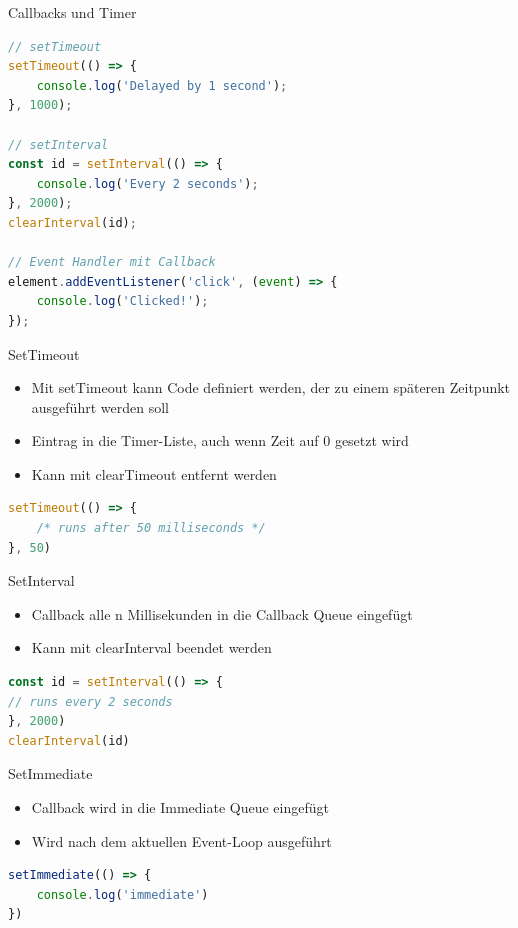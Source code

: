 \begin{KR}{Callbacks und Timer}
\begin{lstlisting}[language=JavaScript, style=basesmol]
// setTimeout
setTimeout(() => {
    console.log('Delayed by 1 second');
}, 1000);

// setInterval
const id = setInterval(() => {
    console.log('Every 2 seconds');
}, 2000);
clearInterval(id);

// Event Handler mit Callback
element.addEventListener('click', (event) => {
    console.log('Clicked!');
});
\end{lstlisting}
\end{KR}

\begin{code}{SetTimeout}
\begin{itemize}
  \item Mit setTimeout kann Code definiert werden, der zu einem späteren Zeitpunkt ausgeführt werden soll
  \item Eintrag in die Timer-Liste, auch wenn Zeit auf 0 gesetzt wird
  \item Kann mit clearTimeout entfernt werden
\end{itemize}
\begin{lstlisting}[language=JavaScript, style=basesmol]
setTimeout(() => {
    /* runs after 50 milliseconds */
}, 50)
\end{lstlisting}
\end{code}

\begin{code}{SetInterval}
\begin{itemize}
  \item Callback alle n Millisekunden in die Callback Queue eingefügt
  \item Kann mit clearInterval beendet werden
\end{itemize}
\begin{lstlisting}[language=JavaScript, style=basesmol]
const id = setInterval(() => {
// runs every 2 seconds
}, 2000)
clearInterval(id)
\end{lstlisting}
\end{code}

\begin{code}{SetImmediate}
\begin{itemize}
  \item Callback wird in die Immediate Queue eingefügt
  \item Wird nach dem aktuellen Event-Loop ausgeführt
\end{itemize}
\begin{lstlisting}[language=JavaScript, style=basesmol]
setImmediate(() => {
    console.log('immediate')
})
\end{lstlisting}
\end{code}

